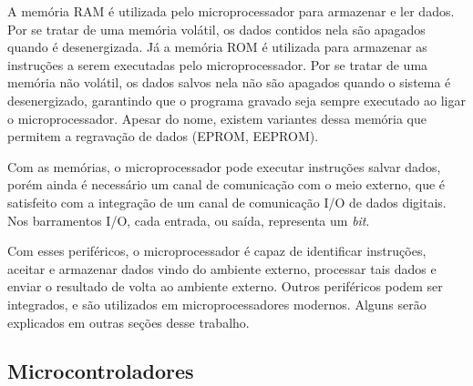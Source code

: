 

A memória \ac{RAM} é utilizada pelo microprocessador para armazenar e ler dados. Por se tratar de uma memória volátil, os dados contidos nela são apagados quando é desenergizada.
Já a memória \ac{ROM} é utilizada para armazenar as instruções a serem executadas pelo microprocessador. Por se tratar de uma memória não volátil, os dados salvos nela não são apagados quando o sistema é desenergizado, garantindo que o programa gravado seja sempre executado ao ligar o microprocessador. Apesar do nome, existem variantes dessa memória que permitem a regravação de dados (\ac{EPROM}, \ac{EEPROM}).

Com as memórias, o microprocessador pode executar instruções salvar dados, porém ainda é necessário um canal de comunicação com o meio externo, que é satisfeito com a integração de um canal de comunicação \ac{I/O} de dados digitais. Nos barramentos \ac{I/O}, cada entrada, ou saída, representa um \textit{bit}. 

Com esses periféricos, o microprocessador é capaz de identificar instruções, aceitar e armazenar dados vindo do ambiente externo, processar tais dados e enviar o resultado de volta ao ambiente externo. Outros periféricos podem ser integrados, e são utilizados em microprocessadores modernos. Alguns serão explicados em outras seções desse trabalho.


\subsection{Microcontroladores}

